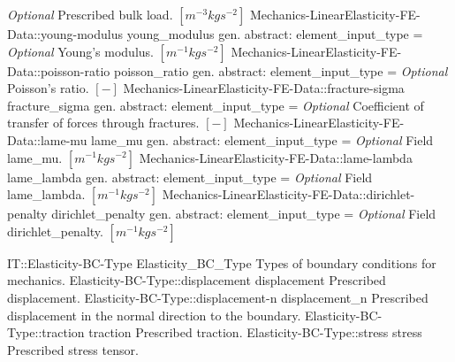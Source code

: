 \begin{RecordType}
			{ \it{Optional}}
			{{{Prescribed bulk load. }{$[m^{-3}kgs^{-2}]$}%
}}
		\RecKey
			{Mechanics-LinearElasticity-FE-Data::young-modulus}
			{young{\_}modulus}
			{{gen. abstract: }}{{element{\_}input{\_}type}{ = }}
			{ \it{Optional}}
			{{{Young's modulus. }{$[m^{-1}kgs^{-2}]$}%
}}
		\RecKey
			{Mechanics-LinearElasticity-FE-Data::poisson-ratio}
			{poisson{\_}ratio}
			{{gen. abstract: }}{{element{\_}input{\_}type}{ = }}
			{ \it{Optional}}
			{{{Poisson's ratio. }{$[-]$}%
}}
		\RecKey
			{Mechanics-LinearElasticity-FE-Data::fracture-sigma}
			{fracture{\_}sigma}
			{{gen. abstract: }}{{element{\_}input{\_}type}{ = }}
			{ \it{Optional}}
			{{{Coefficient of transfer of forces through fractures. }{$[-]$}%
}}
		\RecKey
			{Mechanics-LinearElasticity-FE-Data::lame-mu}
			{lame{\_}mu}
			{{gen. abstract: }}{{element{\_}input{\_}type}{ = }}
			{ \it{Optional}}
			{{{Field lame{\_}mu. }{$[m^{-1}kgs^{-2}]$}%
}}
		\RecKey
			{Mechanics-LinearElasticity-FE-Data::lame-lambda}
			{lame{\_}lambda}
			{{gen. abstract: }}{{element{\_}input{\_}type}{ = }}
			{ \it{Optional}}
			{{{Field lame{\_}lambda. }{$[m^{-1}kgs^{-2}]$}%
}}
		\RecKey
			{Mechanics-LinearElasticity-FE-Data::dirichlet-penalty}
			{dirichlet{\_}penalty}
			{{gen. abstract: }}{{element{\_}input{\_}type}{ = }}
			{ \it{Optional}}
			{{{Field dirichlet{\_}penalty. }{$[m^{-1}kgs^{-2}]$}%
}}
\end{RecordType}
\begin{SelectionType}
	{IT::Elasticity-BC-Type}
	{Elasticity{\_}BC{\_}Type}
	{{{Types of boundary conditions for mechanics.}%
}}
		\SelectionItem
			{Elasticity-BC-Type::displacement}
			{displacement}
			{{{Prescribed displacement.}%
}}
		\SelectionItem
			{Elasticity-BC-Type::displacement-n}
			{displacement{\_}n}
			{{{Prescribed displacement in the normal direction to the boundary.}%
}}
		\SelectionItem
			{Elasticity-BC-Type::traction}
			{traction}
			{{{Prescribed traction.}%
}}
		\SelectionItem
			{Elasticity-BC-Type::stress}
			{stress}
			{{{Prescribed stress tensor.}%
}}
\end{SelectionType}
